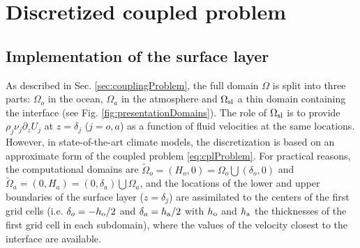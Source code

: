 \section{Discretized coupled problem}\label{sec:discreteProblem}
\subsection{Implementation of the surface layer}
As described in Sec. \ref{sec:couplingProblem}, the full domain 
$\Omega$ is split into three parts: $\Omega_o$ in the ocean, 
$\Omega_a$ in the atmosphere and $\Omega_{\rm sl}$ a thin domain 
containing the interface (see Fig. \ref{fig:presentationDomains}).
The role of  
$\Omega_{\rm sl}$ is to provide $\rho_j \nu_j \partial_z U_j$ 
at $z=\delta_j$ ($j=o,a$) as a function of fluid velocities at the 
same locations. However, in state-of-the-art climate models, the discretization 
is based on an approximate form of the coupled 
problem \eqref{eq:cplProblem}. For practical reasons, the computational
domains are $\widetilde{\Omega}_o = (H_o,0)=\Omega_o \bigcup (\delta_o, 0)$ and 
$\widetilde{\Omega}_a = (0,H_a) = (0,\delta_a ) \bigcup \Omega_a$, and the locations 
of the lower and upper boundaries of the surface layer ($z=\delta_j$)   
are assimilated to the centers of the first grid cells (i.e. $\delta_o=-h_{\rm o}/2$ 
and $\delta_a=h_{\rm a}/2$ with $h_{\rm o}$ and $h_{\rm a}$ the thicknesses of the first grid cell in each 
subdomain), where the  values of the velocity closest to the interface are available. 
%
%
%
